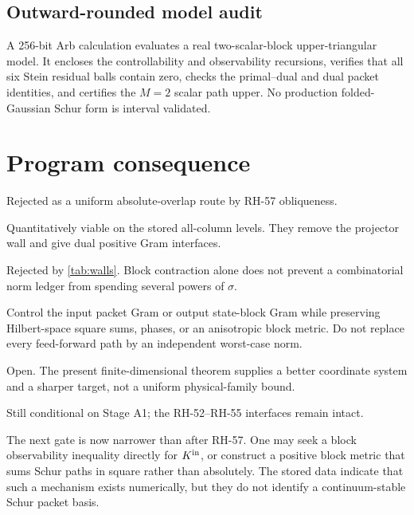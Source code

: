 \documentclass[11pt]{article}
\theoremstyle{remark}
\begin{document}
\subsection{Outward-rounded model audit}

A 256-bit Arb calculation \citep{Johansson2017} evaluates a real
two-scalar-block upper-triangular
model.  It encloses the controllability and observability recursions, verifies
that all six Stein residual balls contain zero, checks the primal--dual and
dual packet identities, and certifies the $M=2$ scalar path upper.  No
production folded-Gaussian Schur form is interval validated.

\section{Program consequence}
\label{sec:consequence}

\begin{description}[leftmargin=4.8cm,style=nextline]
 \item[Fixed radial Riesz blocks]
 Rejected as a uniform absolute-overlap route by RH-57 obliqueness.
 \item[Unitary Schur packet coordinates]
 Quantitatively viable on the stored all-column levels.  They remove the
 projector wall and give dual positive Gram interfaces.
 \item[Scalar absolute Schur paths]
 Rejected by \cref{tab:walls}.  Block contraction alone does not prevent a
 combinatorial norm ledger from spending several powers of $\sigma$.
 \item[Remaining analytic target]
 Control the input packet Gram or output state-block Gram while preserving
 Hilbert-space square sums, phases, or an anisotropic block metric.  Do not
 replace every feed-forward path by an independent worst-case norm.
 \item[Stage A1]
 Open.  The present finite-dimensional theorem supplies a better coordinate
 system and a sharper target, not a uniform physical-family bound.
 \item[Stage A4]
 Still conditional on Stage A1; the RH-52--RH-55 interfaces remain intact.
\end{description}

The next gate is now narrower than after RH-57.  One may seek a block
observability inequality directly for $K^{\rm in}$, or construct a positive
block metric that sums Schur paths in square rather than absolutely.  The
stored data indicate that such a mechanism exists numerically, but they do
not identify a continuum-stable Schur packet basis.
\end{document}
